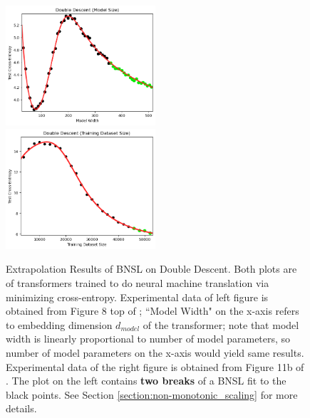 \documentclass{article} %
\begin{document}
\vspace{-2.75mm}


\FloatBarrier
\begin{figure}[h]%
    \centering


\includegraphics[width=0.496\textwidth]{figures/double_descent/double_descent__model_size.png}
\includegraphics[width=0.496\textwidth]{figures/double_descent/double_descent__dataset_size_1.png}
\vspace{-4.0mm}
    \caption{
    Extrapolation Results of BNSL on Double Descent. Both plots are of transformers trained to do neural machine translation via minimizing cross-entropy. Experimental data of left figure is obtained from Figure 8 top of \cite{nakkiran2021deep}; ``Model Width" on the x-axis refers to embedding dimension $d_{model}$ of the transformer; note that model width is linearly proportional to number of model parameters, so number of model parameters on the x-axis would yield same results. Experimental data of the right figure is obtained from Figure 11b of \cite{nakkiran2021deep}. The plot on the left contains \textbf{two breaks} of a BNSL fit to the black points. See Section \ref{section:non-monotonic_scaling} for more details.
    }
    \label{fig:double_descent}
\end{figure}

\vspace{-2.5mm}
\end{document}
